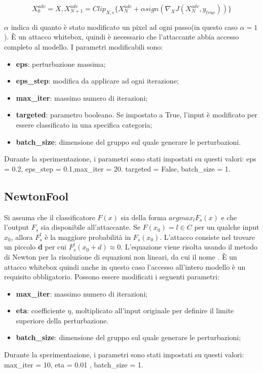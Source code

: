 \[X^{adv}_{0} = X, X^{adv}_{N+1} = Clip_{X,\epsilon}\{ X^{adv}_{N} + \alpha sign(\nabla _{X}J(X^{adv}_{N},y_{true})) \}\]

$\alpha$ indica di quanto è stato modificato un pixel ad ogni passo(in questo caso $\alpha=1$). È un attacco whitebox, quindi è necessario che l'attaccante abbia accesso completo al modello. I parametri modificabili sono:\begin{itemize}
    \item \textbf{eps}: perturbazione massima;
    \item \textbf{eps\_step}: modifica da applicare ad ogni iterazione;
    \item \textbf{max\_iter}: massimo numero di iterazioni;
    \item \textbf{targeted}: parametro booleano. Se impostato a True, l'input è modificato  per essere classificato in una specifica categoria;
    \item \textbf{batch\_size}: dimensione del gruppo sul quale generare le perturbazioni.
\end{itemize}
Durante la sperimentazione, i parametri sono stati impostati su questi valori: eps = 0.2, eps\_step = 0.1,max\_iter = 20. targeted = False, batch\_size = 1.

\subsection{NewtonFool}

Si assuma che  il classificatore $F(x)$ sia della forma $arg max_l F_s(x)$ e che l'output $F_s$ sia disponibile all'attaccante. Se $F(x_0) = l \in C$ per un qualche  input $x_0$, allora $F^l_s$ è la maggiore probabilità
in $F_s(x_0)$. L'attacco consiste nel trovare un piccolo \textbf{d} per cui $F^l_s(x_0 + d) \approx 0$. L'equazione viene risolta usando il metodo di Newton
per la risoluzione di equazioni non lineari, da cui il nome \cite{newton}. È un  attacco whitebox quindi anche in questo caso l'accesso all'intero modello è un requisito obbligatorio. Possono essere modificati i seguenti parametri: \begin{itemize}
    \item \textbf{max\_iter}: massimo numero di iterazioni;
    \item \textbf{eta}: coefficiente $\eta$, moltiplicato all'input originale per definire il limite superiore della perturbazione.
    \item \textbf{batch\_size}: dimensione del gruppo sul quale generare le perturbazioni;
   \end{itemize}
Durante la sperimentazione, i parametri sono stati impostati su questi valori: max\_iter = 10, eta = 0.01 , batch\_size = 1.

